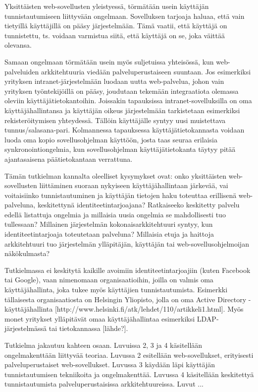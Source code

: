 Yksittäisten web-sovellusten yleistyessä, törmätään usein käyttäjän tunnistautumiseen liittyvään ongelmaan. Sovelluksen tarjoaja haluaa, että vain tietyillä käyttäjillä on pääsy järjestelmään. Tämä vaatii, että käyttäjä on tunnistettu, ts. voidaan varmistua siitä, että käyttäjä on se, joka väittää olevansa.

Samaan ongelmaan törmätään usein myös suljetuissa yhteisössä, kun web-palveluiden arkkitehtuuria viedään palveluperustaiseen suuntaan. Jos esimerkiksi yrityksen int\-ra\-net-järjestelmään luodaan uutta web-palvelua, johon vain yrityksen työntekijöillä on pääsy, joudutaan tekemään integraatiota olemassa oleviin käyttäjätietokantoihin. Joissakin tapauksissa int\-ra\-net-sovelluksilla on oma käyttäjähallintansa ja käyttäjän oikeus järjestelmään tarkistetaan esimerkiksi rekisteröitymisen yhteydessä. Tällöin käyttäjälle syntyy uusi muistettava tunnus/salasana-pari. Kolmannessa tapauksessa käyttäjätietokannasta voidaan luoda oma kopio sovellusohjelman käyttöön, josta taas seuraa erilaisia synkronointiongelmia, kun sovellusohjelman käyttäjätietokanta täytyy pitää ajantasaisena päätietokantaan verrattuna.

Tämän tutkielman kannalta oleelliset kysymykset ovat: onko yksittäisten web-so\-vel\-lus\-ten liittäminen suoraan nykyiseen käyttäjähallintaan järkevää, vai voitaisiinko tunnistautuminen ja käyttäjän tietojen haku toteuttaa erillisenä web-palveluna, keskitettynä identiteetintarjoajana? Ratkaiseeko keskitetty palvelu edellä listattuja ongelmia ja millaisia uusia ongelmia se mahdollisesti tuo tullessaan? Millainen järjestelmän kokonaisarkkitehtuuri syntyy, kun identiteetintarjoaja toteutetaan palveluna? Millaisia etuja ja haittoja arkkitehtuuri tuo järjestelmän ylläpitäjän, käyttäjän tai web-sovellusohjelmoijan näkökulmasta?

Tutkielmassa ei keskitytä kaikille avoimiin identiteetintarjoajiin (kuten Facebook tai Google), vaan nimenomaan organisaatioihin, joilla on valmis oma käyttäjähallinta, joka tukee myös käyttäjien tunnistautumista. Esimerkki tällaisesta organisaatiosta on Helsingin Yliopisto, jolla on oma Active Directory -käyttäjähallinta [http://www.helsinki.fi/atk/lehdet/110/artikkeli1.html]. Myös monet yritykset ylläpitävät omaa käyttäjähallintaa esimerkiksi LDAP-järjestelmässä tai tietokannassa [lähde?].

Tutkielma jakautuu kahteen osaan. Luvuissa 2, 3 ja 4 käsitellään ongelmakenttään liittyvää teoriaa. Luvussa 2 esitellään web-sovellukset, erityisesti palveluperustaiset web-sovellukset. Luvussa 3 käydään läpi käyttäjän tunnistautumisen tekniikoita ja ongelmakenttää. Luvussa 4 käsitellään keskitettyä tunnistautumista palveluperustaisissa arkkitehtuureissa. Luvut ...
